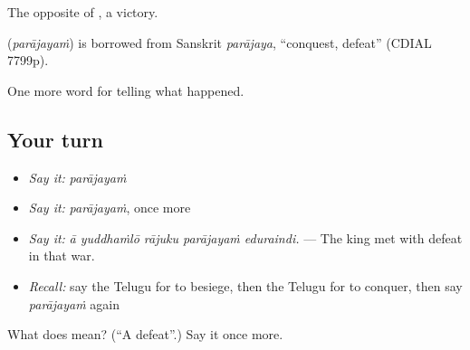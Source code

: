 The opposite of , a victory.

\begin{cousinweb}
\textbf{} (\emph{parājayaṁ}) is borrowed from Sanskrit \emph{parājaya}, \textquotedblleft{}conquest, defeat\textquotedblright{} (CDIAL 7799p).
\end{cousinweb}

\begin{grammarlens}[title={What you've built}]
One more word for telling what happened.
\end{grammarlens}

\subsection*{Your turn}
\begin{itemize}
\raggedright
  \item \emph{Say it:} \emph{parājayaṁ}
  \item \emph{Say it:} \emph{parājayaṁ}, once more
  \item \emph{Say it:} \emph{ā yuddhaṁlō rājuku parājayaṁ eduraindi.} — The king met with defeat in that war.
  \item \emph{Recall:} say the Telugu for to besiege, then the Telugu for to conquer, then say \emph{parājayaṁ} again
\end{itemize}

\begin{tcolorbox}[breakable,colback=teal!4,colframe=teal!35!black,title={Before you move on}]
What does  mean? (\textquotedblleft{}A defeat\textquotedblright{}.) Say it once more.
\end{tcolorbox}
